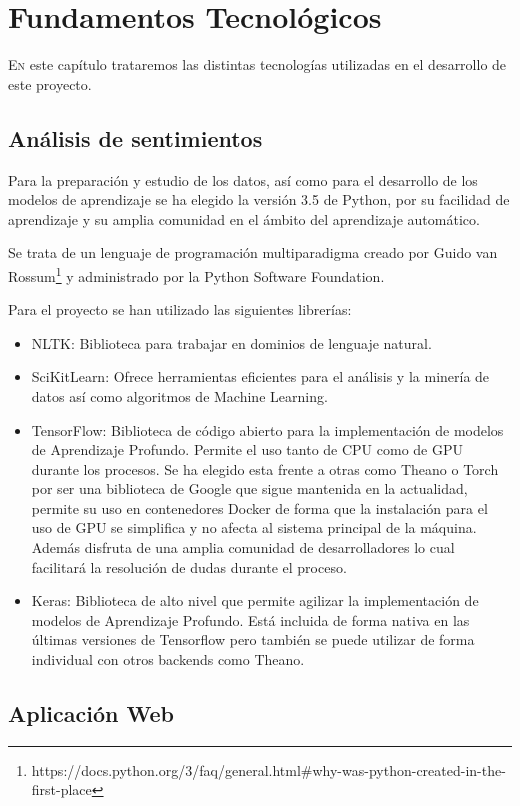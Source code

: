 \chapter{Fundamentos Tecnológicos}
\lettrine{E}{n} este capítulo trataremos las distintas tecnologías utilizadas en el desarrollo de este proyecto.

\section{Análisis de sentimientos}

Para la preparación y estudio de los datos, así como para el desarrollo de los modelos de aprendizaje se ha elegido la versión 3.5 de Python, por su facilidad de aprendizaje y su amplia comunidad en el ámbito del aprendizaje automático.

Se trata de un lenguaje de programación multiparadigma creado por Guido van Rossum\footnote{https://docs.python.org/3/faq/general.html\#why-was-python-created-in-the-first-place} y administrado por la Python Software Foundation. 

Para el proyecto se han utilizado las siguientes librerías:


\begin{itemize}
	\item NLTK: Biblioteca para trabajar en dominios de lenguaje natural.
	\item SciKitLearn: Ofrece herramientas eficientes para el análisis y la minería de datos así como algoritmos de Machine Learning.
	\item TensorFlow: Biblioteca de código abierto para la implementación de modelos de Aprendizaje Profundo. Permite el uso tanto de CPU como de GPU durante los procesos. Se ha elegido esta frente a otras como Theano o Torch por ser una biblioteca de Google que sigue mantenida en la actualidad, permite su uso en contenedores Docker de forma que la instalación para el uso de GPU se simplifica y no afecta al sistema principal de la máquina. Además disfruta de una amplia comunidad de desarrolladores lo cual facilitará la resolución de dudas durante el proceso. 
	\item Keras: Biblioteca de alto nivel que permite agilizar la implementación de modelos de Aprendizaje Profundo. Está incluida de forma nativa en las últimas versiones de Tensorflow pero también se puede utilizar de forma individual con otros backends como Theano.
\end{itemize}


\section{Aplicación Web}

